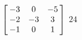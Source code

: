 {$\left[\hskip -3pt \begin{array}{ccc} -3&0&-5\\  -2&-3&3
\\  -1&0&1\end{array}\hskip -3pt \right]$} 
{$24$}



  

